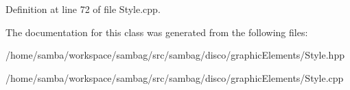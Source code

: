 Definition at line 72 of file Style.cpp.



The documentation for this class was generated from the following files:\begin{DoxyCompactItemize}
\item 
/home/samba/workspace/sambag/src/sambag/disco/graphicElements/Style.hpp\item 
/home/samba/workspace/sambag/src/sambag/disco/graphicElements/Style.cpp\end{DoxyCompactItemize}
